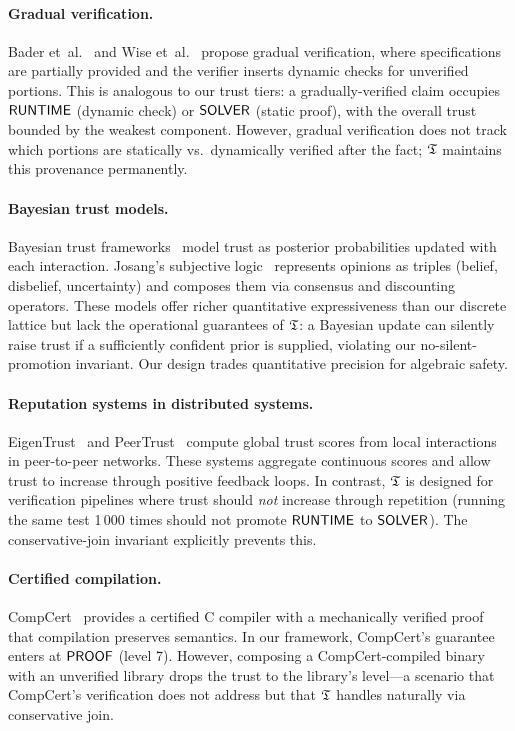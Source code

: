\documentclass[11pt]{article}
\begin{document}
\paragraph{Gradual verification.}
Bader et~al.~\cite{bader18} and Wise et~al.~\cite{wise20}
propose gradual verification, where specifications are
partially provided and the verifier inserts dynamic checks
for unverified portions.  This is analogous to our trust
tiers: a gradually-verified claim occupies $\mathsf{RUNTIME}$
(dynamic check) or $\mathsf{SOLVER}$ (static proof), with the
overall trust bounded by the weakest component.  However,
gradual verification does not track which portions are
statically vs.\ dynamically verified after the fact;
$\mathfrak{T}$ maintains this provenance permanently.

\paragraph{Bayesian trust models.}
Bayesian trust frameworks~\cite{josang02,mui02} model trust
as posterior probabilities updated with each interaction.
Josang's subjective logic~\cite{josang16} represents
opinions as triples (belief, disbelief, uncertainty) and
composes them via consensus and discounting operators.
These models offer richer quantitative expressiveness
than our discrete lattice but lack the operational
guarantees of $\mathfrak{T}$: a Bayesian update can silently
raise trust if a sufficiently confident prior is supplied,
violating our no-silent-promotion invariant.  Our design
trades quantitative precision for algebraic safety.

\paragraph{Reputation systems in distributed systems.}
EigenTrust~\cite{kamvar03} and PeerTrust~\cite{xiong04}
compute global trust scores from local interactions in
peer-to-peer networks.  These systems aggregate continuous
scores and allow trust to increase through positive feedback
loops.  In contrast, $\mathfrak{T}$ is designed for verification
pipelines where trust should \emph{not} increase through
repetition (running the same test 1\,000 times should not
promote $\mathsf{RUNTIME}$ to $\mathsf{SOLVER}$).  The conservative-join
invariant explicitly prevents this.

\paragraph{Certified compilation.}
CompCert~\cite{leroy09} provides a certified C compiler
with a mechanically verified proof that compilation preserves
semantics.  In our framework, CompCert's guarantee enters at
$\mathsf{PROOF}$ (level 7).  However, composing a CompCert-compiled
binary with an unverified library drops the trust to the
library's level---a scenario that CompCert's verification
does not address but that $\mathfrak{T}$ handles naturally via
conservative join.
\end{document}

